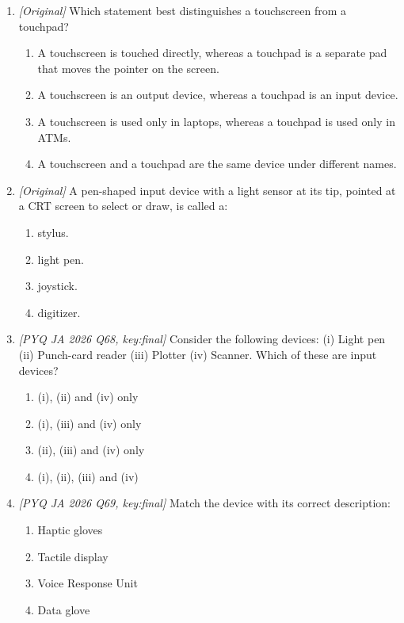 \documentclass[11pt]{article}
\begin{document}
\begin{enumerate}[label=\textbf{Q\arabic*.}, leftmargin=*]
\item \textit{[Original]} Which statement best distinguishes a touchscreen
  from a touchpad?
  \begin{enumerate}[label=\Alph*.]
    \item A touchscreen is touched directly, whereas a touchpad is a separate
      pad that moves the pointer on the screen.
    \item A touchscreen is an output device, whereas a touchpad is an input
      device.
    \item A touchscreen is used only in laptops, whereas a touchpad is used
      only in ATMs.
    \item A touchscreen and a touchpad are the same device under different
      names.
  \end{enumerate}
\item \textit{[Original]} A pen-shaped input device with a light sensor at its
  tip, pointed at a CRT screen to select or draw, is called a:
  \begin{enumerate}[label=\Alph*.]
    \item stylus.
    \item light pen.
    \item joystick.
    \item digitizer.
  \end{enumerate}
\item \textit{[PYQ JA 2026 Q68, key:final]} Consider the following devices:
  (i) Light pen (ii) Punch-card reader (iii) Plotter (iv) Scanner. Which of
  these are input devices?
  \begin{enumerate}[label=\Alph*.]
    \item (i), (ii) and (iv) only
    \item (i), (iii) and (iv) only
    \item (ii), (iii) and (iv) only
    \item (i), (ii), (iii) and (iv)
  \end{enumerate}
\item \textit{[PYQ JA 2026 Q69, key:final]} Match the device with its correct
  description:
  \begin{enumerate}[label=\Roman*.]
    \item Haptic gloves
    \item Tactile display
    \item Voice Response Unit
    \item Data glove
  \end{enumerate}
  \begin{enumerate}[label=\arabic*.]

\end{enumerate}
\end{enumerate}
\end{document}
